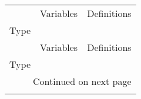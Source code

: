 \begin{longtable}[h!]{lll}
\toprule
{} &           Variables &                                                                                          Definitions \\
Type           &                     &                                                                                                      \\
\midrule
\endfirsthead

\toprule
{} &           Variables &                                                                                          Definitions \\
Type           &                     &                                                                                                      \\
\midrule
\endhead
\midrule
\multicolumn{3}{r}{{Continued on next page}} \\
\midrule
\endfoot


\end{longtable}
